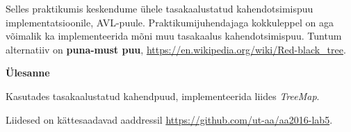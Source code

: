 \documentclass[a4paper]{article}
\begin{document}
Selles praktikumis keskendume ühele tasakaalustatud kahendotsimispuu implementatsioonile, AVL-puule. Praktikumijuhendajaga kokkuleppel on aga võimalik ka implementeerida mõni muu tasakaalus kahendotsimispuu. Tuntum alternatiiv on \textbf{puna-must puu}, \url{https://en.wikipedia.org/wiki/Red-black_tree}.



\begin{problem}
\textbf{Ülesanne}

Kasutades tasakaalustatud kahendpuud, implementeerida liides \textit{TreeMap}.
\end{problem}

Liidesed on kättesaadavad aaddressil \url{https://github.com/ut-aa/aa2016-lab5}.
\end{document}
